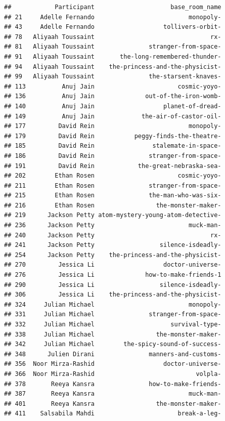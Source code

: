 \documentclass[
]{article}
\begin{document}
\begin{verbatim}
##            Participant                     base_room_name
## 21     Adelle Fernando                          monopoly-
## 43     Adelle Fernando                   tollivers-orbit-
## 78   Aliyaah Toussaint                                rx-
## 81   Aliyaah Toussaint               stranger-from-space-
## 91   Aliyaah Toussaint       the-long-remembered-thunder-
## 94   Aliyaah Toussaint    the-princess-and-the-physicist-
## 99   Aliyaah Toussaint               the-starsent-knaves-
## 113          Anuj Jain                       cosmic-yoyo-
## 136          Anuj Jain              out-of-the-iron-womb-
## 140          Anuj Jain                   planet-of-dread-
## 149          Anuj Jain             the-air-of-castor-oil-
## 177         David Rein                          monopoly-
## 179         David Rein           peggy-finds-the-theatre-
## 185         David Rein                stalemate-in-space-
## 186         David Rein               stranger-from-space-
## 191         David Rein            the-great-nebraska-sea-
## 202        Ethan Rosen                       cosmic-yoyo-
## 211        Ethan Rosen               stranger-from-space-
## 215        Ethan Rosen               the-man-who-was-six-
## 216        Ethan Rosen                 the-monster-maker-
## 219      Jackson Petty atom-mystery-young-atom-detective-
## 236      Jackson Petty                          muck-man-
## 240      Jackson Petty                                rx-
## 241      Jackson Petty                  silence-isdeadly-
## 254      Jackson Petty    the-princess-and-the-physicist-
## 270         Jessica Li                   doctor-universe-
## 276         Jessica Li              how-to-make-friends-1
## 290         Jessica Li                  silence-isdeadly-
## 306         Jessica Li    the-princess-and-the-physicist-
## 324     Julian Michael                          monopoly-
## 331     Julian Michael               stranger-from-space-
## 332     Julian Michael                     survival-type-
## 338     Julian Michael                 the-monster-maker-
## 342     Julian Michael        the-spicy-sound-of-success-
## 348      Julien Dirani               manners-and-customs-
## 356  Noor Mirza-Rashid                   doctor-universe-
## 366  Noor Mirza-Rashid                            volpla-
## 378       Reeya Kansra               how-to-make-friends-
## 387       Reeya Kansra                          muck-man-
## 401       Reeya Kansra                 the-monster-maker-
## 411    Salsabila Mahdi                       break-a-leg-

\end{verbatim}
\end{document}
